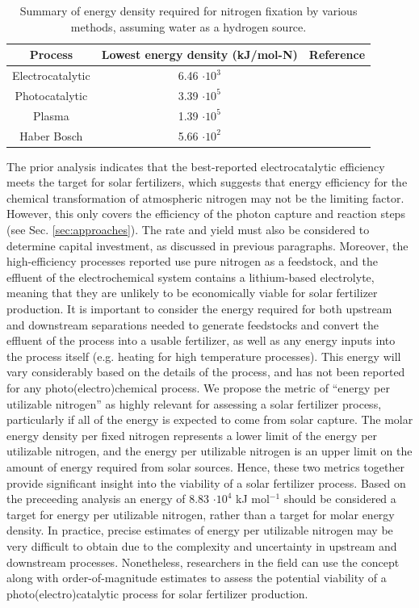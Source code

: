 \begin{table}
\centering
\begin{tabular}{ |c c c| }
\hline
 Process & Lowest energy density (kJ/mol-N) & Reference \\  \hline
 Electrocatalytic & 6.46 $\cdot 10^3$ & \cite{Song_2018} \\ \hline
 Photocatalytic & 3.39 $\cdot 10^5$ & \cite{Shiraishi_2018} \\ \hline
 Plasma & 1.39  $\cdot 10^5$  & \cite{Hawtof_2019} \\ \hline
 Haber Bosch & 5.66 $\cdot 10^2$ & \cite{Grundt_1982} \\ \hline
\end{tabular}
\caption{Summary of energy density required for nitrogen fixation by various methods, assuming water as a hydrogen source. }
\label{tab:energy_density}
\end{table}


The prior analysis indicates that the best-reported electrocatalytic efficiency meets the target for solar fertilizers, which suggests that energy efficiency for the chemical transformation of atmospheric nitrogen may not be the limiting factor. However, this only covers the efficiency of the photon capture and reaction steps (see Sec. \ref{sec:approaches}). The rate and yield must also be considered to determine capital investment, as discussed in previous paragraphs. Moreover, the high-efficiency processes reported use pure nitrogen as a feedstock, and the effluent of the electrochemical system contains a lithium-based electrolyte, meaning that they are unlikely to be economically viable for solar fertilizer production. It is important to consider the energy required for both upstream and downstream separations needed to generate feedstocks and convert the effluent of the process into a usable fertilizer, as well as any energy inputs into the process itself (e.g. heating for high temperature processes). This energy will vary considerably based on the details of the process, and has not been reported for any photo(electro)chemical process. We propose the metric of ``energy per utilizable nitrogen'' as highly relevant for assessing a solar fertilizer process, particularly if all of the energy is expected to come from solar capture. The molar energy density per fixed nitrogen represents a lower limit of the energy per utilizable nitrogen, and the energy per utilizable nitrogen is an upper limit on the amount of energy required from solar sources. Hence, these two metrics together provide significant insight into the viability of a solar fertilizer process. Based on the preceeding analysis an energy of 8.83 $\cdot 10^4$ kJ mol$^{-1}$ should be considered a target for energy per utilizable nitrogen, rather than a target for molar energy density. In practice, precise estimates of energy per utilizable nitrogen may be very difficult to obtain due to the complexity and uncertainty in upstream and downstream processes. Nonetheless, researchers in the field can use the concept along with order-of-magnitude estimates to assess the potential viability of a photo(electro)catalytic process for solar fertilizer production.

